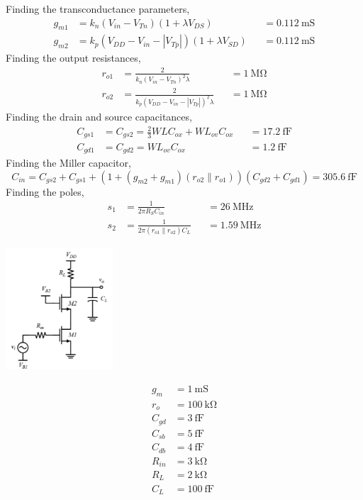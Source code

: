 \documentclass{article}
\begin{document}
\begin{subparts}
  Finding the transconductance parameters,
  \begin{align}
    g_{m1} &= k_{n} (V_{in} - V_{Tn}) (1 + \lambda V_{DS}) &&= \qty{0.112}{\milli\siemens} \\
    g_{m2} &= k_{p} (V_{DD} - V_{in} - |V_{Tp}|) (1 + \lambda V_{SD}) &&= \qty{0.112}{\milli\siemens}
  \end{align}
  Finding the output resistances,
  \begin{align}
    r_{o1} &= \frac{2}{k_{n} (V_{in} - V_{Tn})^{2} \lambda} &&= \qty{1}{\mega\ohm} \\
    r_{o2} &= \frac{2}{k_{p} (V_{DD} - V_{in} - |V_{Tp}|)^{2} \lambda} &&= \qty{1}{\mega\ohm}
  \end{align}
  Finding the drain and source capacitances,
  \begin{align}
    C_{gs1} &= C_{gs2} = \frac{2}{3} W L C_{ox} + W L_{ov} C_{ox} &&= \qty{17.2}{\femto\farad} \\
    C_{gd1} &= C_{gd2} = W L_{ov} C_{ox} &&= \qty{1.2}{\femto\farad}
  \end{align}
  Finding the Miller capacitor,
  \begin{equation}
    C_{in} = C_{gs2} + C_{gs1} + (1 + (g_{m2} + g_{m1}) (r_{o2} \parallel r_{o1})) (C_{gd2} + C_{gd1}) = \qty{305.6}{\femto\farad}
  \end{equation}
  Finding the poles,
  \begin{align}
    s_{1} &= \frac{1}{2\pi R_{S} C_{in}} &&= \qty{26}{\mega\hertz} \\
    s_{2} &= \frac{1}{2\pi (r_{o1} \parallel r_{o2}) C_{L}} &&= \qty{1.59}{\mega\hertz}
  \end{align}
\end{subparts}

\question{}

\begin{center}
  \includegraphics[width=0.3\textwidth]{q3.png}
\end{center}
\begin{align}
  g_{m} &= \qty{1}{\milli\siemens} \\
  r_{o} &= \qty{100}{\kilo\ohm} \\
  C_{gd} &= \qty{3}{\femto\farad} \\
  C_{sb} &= \qty{5}{\femto\farad} \\
  C_{db} &= \qty{4}{\femto\farad} \\
  R_{in} &= \qty{3}{\kilo\ohm} \\
  R_{L} &= \qty{2}{\kilo\ohm} \\
  C_{L} &= \qty{100}{\femto\farad}
\end{align}
\end{document}
